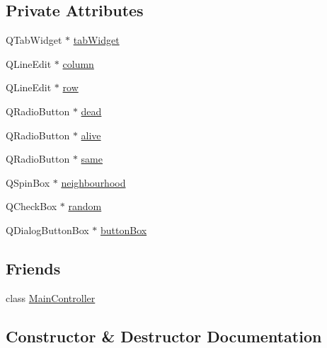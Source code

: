 \subsection*{Private Attributes}
\begin{DoxyCompactItemize}
\item 
Q\+Tab\+Widget $\ast$ \mbox{\hyperlink{class_automata_parameters_aca77fcb495c7820c6d571684671e594b}{tab\+Widget}}
\item 
Q\+Line\+Edit $\ast$ \mbox{\hyperlink{class_automata_parameters_a03f985866b0f323e94b5a1d568fa052d}{column}}
\item 
Q\+Line\+Edit $\ast$ \mbox{\hyperlink{class_automata_parameters_a8823a82d6cb4f6ed9f1359e43500e30e}{row}}
\item 
Q\+Radio\+Button $\ast$ \mbox{\hyperlink{class_automata_parameters_ab81d709fa04c426c661c443c95284bd2}{dead}}
\item 
Q\+Radio\+Button $\ast$ \mbox{\hyperlink{class_automata_parameters_ac38a724b4bc923a1515b2fc0e075ccf6}{alive}}
\item 
Q\+Radio\+Button $\ast$ \mbox{\hyperlink{class_automata_parameters_a9f35c892bdbb5674713978eaac1864b3}{same}}
\item 
Q\+Spin\+Box $\ast$ \mbox{\hyperlink{class_automata_parameters_a5e7d624be5787381d22d85a48b3c1595}{neighbourhood}}
\item 
Q\+Check\+Box $\ast$ \mbox{\hyperlink{class_automata_parameters_a417b0bba086be74ed18a21ceb1e6d835}{random}}
\item 
Q\+Dialog\+Button\+Box $\ast$ \mbox{\hyperlink{class_automata_parameters_a4da6ee987dbbf3956a5167f75b72548a}{button\+Box}}
\end{DoxyCompactItemize}
\subsection*{Friends}
\begin{DoxyCompactItemize}
\item 
class \mbox{\hyperlink{class_automata_parameters_a154f5ffe46dc74c6c94311b4cc3927ae}{Main\+Controller}}
\end{DoxyCompactItemize}


\subsection{Constructor \& Destructor Documentation}
\mbox{\label{class_automata_parameters_a67caea1bf676cb572a00da603732e7df}} 
